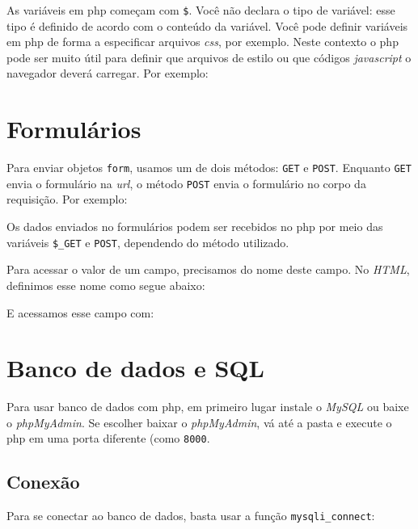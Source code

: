 \documentclass[12pt, a4paper]{article}
\begin{document}
As variáveis em php começam com \verb|$|. Você não declara o tipo de variável: esse tipo é definido de acordo com o conteúdo da variável. Você pode definir variáveis em php de forma a especificar arquivos \textit{css}, por exemplo. Neste contexto o php pode ser muito útil para definir que arquivos de estilo ou que códigos \textit{javascript} o navegador deverá carregar. Por exemplo:\\


\section{Formulários}

Para enviar objetos \verb|form|, usamos um de dois métodos: \verb|GET| e \verb|POST|. Enquanto \verb|GET| envia o formulário na \textit{url}, o método \verb|POST| envia o formulário no corpo da requisição. Por exemplo:\\


Os dados enviados no formulários podem ser recebidos no php por meio das variáveis \verb|$_GET| e \verb|POST|, dependendo do método utilizado.

Para acessar o valor de um campo, precisamos do nome deste campo. No \textit{HTML}, definimos esse nome como segue abaixo:\\


E acessamos esse campo com:\\


\section{Banco de dados e SQL}

Para usar banco de dados com php, em primeiro lugar instale o \textit{MySQL} ou baixe o \textit{phpMyAdmin}. Se escolher baixar o \textit{phpMyAdmin}, vá até a pasta e execute o php em uma porta diferente (como \verb|8000|.

\subsection{Conexão}

Para se conectar ao banco de dados, basta usar a função \verb|mysqli_connect|:\\
\end{document}
